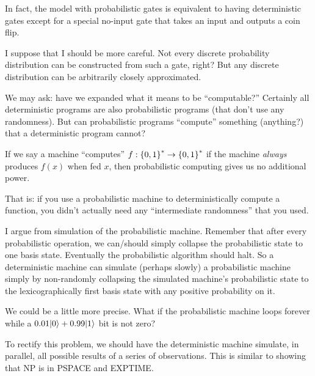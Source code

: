 \begin{remark}
  In fact, the model with probabilistic gates is equivalent to having
  deterministic gates except for a special no-input gate that takes an
  input and outputs a coin flip.

  I suppose that I should be more careful. Not every discrete
  probability distribution can be constructed from such a gate, right?
  But any discrete distribution can be arbitrarily closely approximated.
\end{remark}

\begin{remark}
  We may ask: have we expanded what it means to be ``computable?''
  Certainly all deterministic programs are also probabilistic programs
  (that don't use any randomness). But can probabilistic programs
  ``compute'' something (anything?) that a deterministic program cannot?

  If we say a machine ``computes'' $f: \left\{ 0, 1 \right\}^* \to \left\{ 0,
  1 \right\}^*$ if the machine \emph{always} produces $f(x)$ when fed $x$, then
  probabilistic computing gives us no additional power.

  That is: if you use a probabilistic machine to deterministically
  compute a function, you didn't actually need any ``intermediate
  randomness'' that you used.

  I argue from simulation of the probabilistic machine. Remember that
  after every probabilistic operation, we can/should simply collapse the
  probabilistic state to one basis state. Eventually the probabilistic
  algorithm should halt. So a deterministic machine can simulate
  (perhaps slowly) a probabilistic machine simply by non-randomly
  collapsing the simulated machine's probabilistic state to the
  lexicographically first basis state with any positive probability on
  it.
\end{remark}

\begin{remark}
  We could be a little more precise. What if the probabilistic machine
  loops forever while a $0.01 |0\rangle + 0.99 |1\rangle$ bit is not
  zero?

  To rectify this problem, we should have the deterministic machine
  simulate, in parallel, all possible results of a series of
  observations. This is similar to showing that NP is in PSPACE and
  EXPTIME.
\end{remark}

